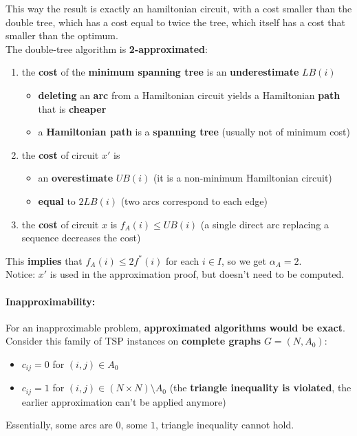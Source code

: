 This way the result is exactly an hamiltonian circuit, with a cost smaller than the double tree, which has a cost equal to twice the tree, which itself has a cost that smaller than the optimum.\\

The double-tree algorithm is \textbf{2-approximated}:
\begin{enumerate}
	\item the \textbf{cost} of the \textbf{minimum spanning tree} is an \textbf{underestimate} $LB (i )$
	\begin{itemize}
		\item \textbf{deleting} an \textbf{arc} from a Hamiltonian circuit yields a Hamiltonian \textbf{path} that is \textbf{cheaper}
		\item a \textbf{Hamiltonian path} is a \textbf{spanning tree} (usually not of minimum cost)
	\end{itemize}
	\item the \textbf{cost} of circuit $x'$ is
	\begin{itemize}
		\item an \textbf{overestimate} $UB (i )$ (it is a non-minimum Hamiltonian circuit)
		\item \textbf{equal} to $2LB (i )$ (two arcs correspond to each edge)
	\end{itemize}
	\item the \textbf{cost} of circuit $x$ is $f_A (i ) \leq UB (i )$ (a single direct arc replacing a sequence decreases the cost)
\end{enumerate}
This \textbf{implies} that $f_A (i ) \leq 2f^\ast (i )$ for each $i \in I$, so we get $\alpha_A = 2$.\\

Notice: $x'$ is used in the approximation proof, but doesn't need to be computed.\\

\newpage

\paragraph{Inapproximability:} For an inapproximable problem, \textbf{approximated algorithms would be exact}.\\
Consider this family of TSP instances on \textbf{complete graphs} $G = (N, A_0)$:
\begin{itemize}
	\item $c_{ij} = 0$ for $(i, j) \in A_0$
	\item $c_{ij} = 1$ for $(i, j) \in  (N \times N) \setminus A_0$ (the \textbf{triangle inequality is violated}, the earlier approximation can't be applied anymore)
\end{itemize}
Essentially, some arcs are $0$, some $1$, triangle inequality cannot hold.\\

